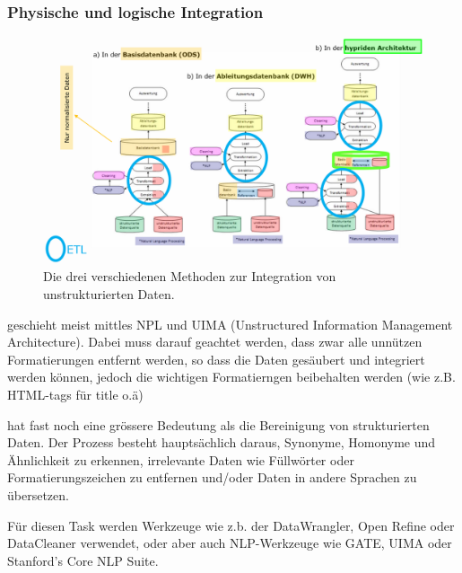 \documentclass[a4paper, 11pt]{article}
\begin{document}
\subsubsection{Physische und logische Integration}
\begin{figure}[htb]
	\centering
	\includegraphics[keepaspectratio=true,height=15\baselineskip]{unstruktdata.PNG}
	\caption{Die drei verschiedenen Methoden zur Integration von unstrukturierten Daten.}
	\label{fig:logInt}
\end{figure}

 geschieht meist mittles NPL und UIMA (Unstructured Information Management Architecture). Dabei muss darauf geachtet werden, dass zwar alle unnützen Formatierungen entfernt werden, so dass die Daten gesäubert und integriert werden können, jedoch die wichtigen Formatierngen beibehalten werden (wie z.B. HTML-tags für title o.ä)

\vspace{10px}

 hat fast noch eine grössere Bedeutung als die Bereinigung von strukturierten Daten. Der Prozess besteht hauptsächlich daraus, Synonyme, Homonyme und Ähnlichkeit zu erkennen, irrelevante Daten wie Füllwörter oder Formatierungszeichen zu entfernen und/oder Daten in andere Sprachen zu übersetzen.

Für diesen Task werden Werkzeuge wie z.b. der DataWrangler, Open Refine oder DataCleaner verwendet, oder aber auch NLP-Werkzeuge wie GATE, UIMA oder Stanford's Core NLP Suite.
\vspace{10px}
\end{document}
